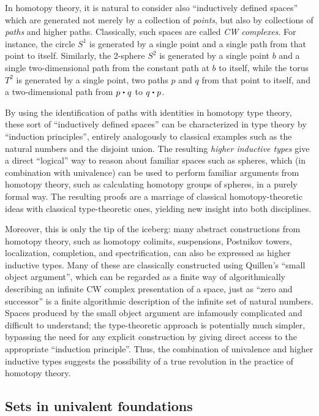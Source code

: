 In homotopy theory, it is natural to consider also ``inductively defined spaces'' which are generated not merely by a collection of \emph{points}, but also by collections of \emph{paths} and higher paths.
Classically, such spaces are called \emph{CW complexes}.
For instance, the circle $S^1$ is generated by a single point and a single path from that point to itself.
Similarly, the 2-sphere $S^2$ is generated by a single point $b$ and a single two-dimensional path from the constant path at $b$ to itself, while the torus $T^2$ is generated by a single point, two paths $p$ and $q$ from that point to itself, and a two-dimensional path from $p\ct q$ to $q\ct p$.

By using the identification of paths with identities in homotopy type theory, these sort of ``inductively defined spaces'' can be characterized in type theory by ``induction principles'', entirely analogously to classical examples such as the natural numbers and the disjoint union.
The resulting \emph{higher inductive types} give a direct ``logical'' way to reason about familiar spaces such as spheres, which (in combination with univalence) can be used to perform familiar arguments from homotopy theory, such as calculating homotopy groups of spheres, in a purely formal way.
The resulting proofs are a marriage of classical homotopy-theoretic ideas with classical type-theoretic ones, yielding new insight into both disciplines.

Moreover, this is only the tip of the iceberg: many abstract constructions from homotopy theory, such as homotopy colimits, suspensions, Postnikov towers, localization, completion, and spectrification, can also be expressed as higher inductive types.
Many of these are classically constructed using Quillen's ``small object argument'', which can be regarded as a finite way of algorithmically describing an infinite CW complex presentation of a space, just as ``zero and successor'' is a finite algorithmic description of the infinite set of natural numbers.
Spaces produced by the small object argument are infamously complicated and difficult to understand; the type-theoretic approach is potentially much simpler, bypassing the need for any explicit construction by giving direct access to the appropriate ``induction principle''.
Thus, the combination of univalence and higher inductive types suggests the possibility of a true revolution in the practice of homotopy theory.


\subsection*{Sets in univalent foundations}


